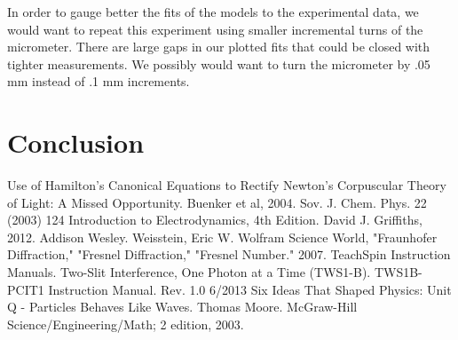 \documentclass[prb,preprint]{revtex4-1}
\begin{document}
In order to gauge better the fits of the models to the experimental data, we would want to repeat this experiment using smaller incremental turns of the micrometer.  There are large gaps in our plotted fits that could be closed with tighter measurements.  We possibly would want to turn the micrometer by .05 mm instead of .1 mm increments.  

\section{Conclusion}

 
\begin{thebibliography}{3}
 Use of Hamilton's Canonical Equations to Rectify Newton's Corpuscular Theory of Light:  A Missed Opportunity.  Buenker et al, 2004.  Sov. J. Chem. Phys. 22 (2003) 124
 Introduction to Electrodynamics, 4th Edition.  David J. Griffiths, 2012.  Addison Wesley.
Weisstein, Eric W. Wolfram Science World, "Fraunhofer Diffraction," "Fresnel Diffraction," "Fresnel Number." 2007. 
 TeachSpin Instruction Manuals.  Two-Slit Interference, One Photon at a Time (TWS1-B).  TWS1B-PCIT1 Instruction Manual. Rev. 1.0 6/2013
 Six Ideas That Shaped Physics: Unit Q - Particles Behaves Like Waves.  Thomas Moore.  McGraw-Hill Science/Engineering/Math; 2 edition, 2003.

\end{thebibliography}
\end{document}
